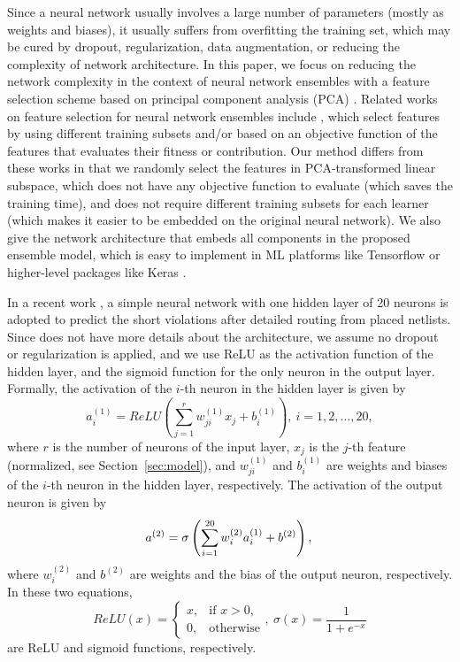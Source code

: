 \documentclass[10pt, final, letter, twocolumns]{IEEEtran}
\begin{document}
Since a neural network usually involves a large number of parameters (mostly as weights and biases), it usually suffers from overfitting the training set, which may be cured by dropout, regularization, data augmentation, or reducing the complexity of network architecture. In this paper, we focus on reducing the network complexity in the context of neural network ensembles with a feature selection scheme based on principal component analysis (PCA) \cite{PCA}. Related works on feature selection for neural network ensembles include \cite{FS92ga, FS99opitz, FS00, FS07PCA, FS10}, which select features by using different training subsets and/or based on an objective function of the features that evaluates their fitness or contribution. Our method differs from these works in that we randomly select the features in PCA-transformed linear subspace, which does not have any objective function to evaluate (which saves the training time), and does not require different training subsets for each learner (which makes it easier to be embedded on the original neural network). We also give the network architecture that embeds all components in the proposed ensemble model, which is easy to implement in ML platforms like Tensorflow \cite{tensorflow} or higher-level packages like Keras \cite{keras}.

In a recent work \cite{DAC18}, a simple neural network with one hidden layer of 20 neurons is adopted to predict the short violations after detailed routing from placed netlists. Since \cite{DAC18} does not have more details about the architecture, we assume no dropout or regularization is applied, and we use ReLU as the activation function of the hidden layer, and the sigmoid function for the only neuron in the output layer. Formally, the activation of the $i$-th neuron in the hidden layer is given by
\begin{equation}
a_{i}^{(1)}=ReLU\left(\sum_{j=1}^r w_{ji}^{(1)}x_{j}+b_{i}^{(1)}\right),~i=1,2,\dots,20,
\label{eqn:hidden}
\end{equation}
where $r$ is the number of neurons of the input layer, $x_{j}$ is the $j$-th feature (normalized, see Section~\ref{sec:model}), and $w_{ji}^{(1)}$ and $b_{i}^{(1)}$ are weights and biases of the $i$-th neuron in the hidden layer, respectively.
The activation of the output neuron is given by
\begin{equation}
a^{(2)}=\sigma\left(\sum_{i=1}^{20} w_{i}^{(2)}a_{i}^{(1)}+b^{(2)}\right),\\
\end{equation}
where $w_{i}^{(2)}$ and $b^{(2)}$ are weights and the bias of the output neuron, respectively. In these two equations,
\begin{equation*}
ReLU(x)=\begin{cases}x, & \text{if } x > 0,\\0, & \text{otherwise}\end{cases},~\sigma(x)=\frac{1}{1+e^{-x}}
\end{equation*}
are ReLU and sigmoid functions, respectively.
\end{document}
